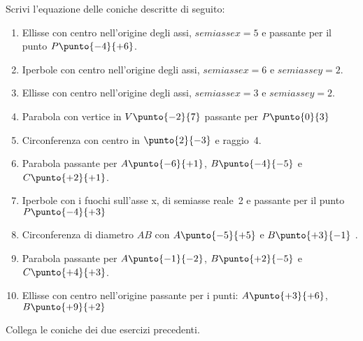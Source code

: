 \begin{esercizio}\label{ese:03.1}
Scrivi l'equazione delle coniche descritte di seguito:
 \begin{enumerate} [nosep]
  \item  Ellisse con centro nell'origine degli assi, 
 \(semiassex=5\) e passante per il punto \(P\punto{-4}{+6}\).
  \item  Iperbole con centro nell'origine degli assi, 
  \(semiassex=6\) e \(semiassey=2\).
  \item  Ellisse con centro nell'origine degli assi, 
  \(semiassex=3\) e \(semiassey=2\).
  \item  Parabola con vertice in \(V\punto{-2}{7}\) 
  passante per \(P\punto{0}{3}\)
  \item  Circonferenza con centro in \(\punto{2}{-3}\) e raggio~4.
  \item  Parabola passante per \(A\punto{-6}{+1}\), \(B\punto{-4}{-5}\) e 
  \(C\punto{+2}{+1}\).
  \item  Iperbole con i fuochi sull'asse x, di semiasse reale~2 e
  passante per il punto \(P\punto{-4}{+3}\)
  \item  Circonferenza di diametro \(AB\) con
  \(A\punto{-5}{+5}\) e \(B\punto{+3}{-1}\) .
  \item  Parabola passante per \(A\punto{-1}{-2}\), \(B\punto{+2}{-5}\) e 
  \(C\punto{+4}{+3}\).
  \item  Ellisse con centro nell'origine passante per i punti:
  \(A\punto{+3}{+6}\), \(B\punto{+9}{+2}\)
 \end{enumerate}
\end{esercizio}

\begin{esercizio}\label{ese:03.1}
Collega le coniche dei due esercizi precedenti.
\end{esercizio}
